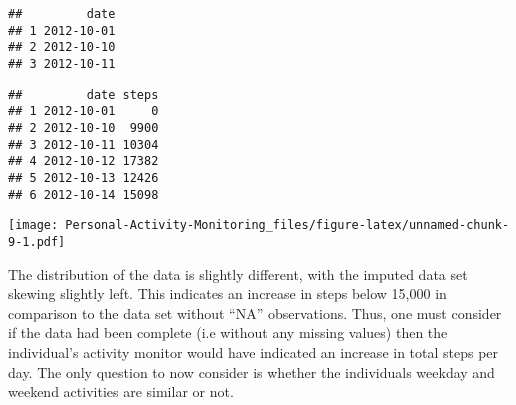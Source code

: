 \documentclass[]{article}
\newenvironment{Shaded}{\begin{snugshade}}{\end{snugshade}}
\newcommand{\KeywordTok}[1]{\textcolor[rgb]{0.13,0.29,0.53}{\textbf{#1}}}
\newcommand{\DataTypeTok}[1]{\textcolor[rgb]{0.13,0.29,0.53}{#1}}
\newcommand{\DecValTok}[1]{\textcolor[rgb]{0.00,0.00,0.81}{#1}}
\newcommand{\StringTok}[1]{\textcolor[rgb]{0.31,0.60,0.02}{#1}}
\newcommand{\OperatorTok}[1]{\textcolor[rgb]{0.81,0.36,0.00}{\textbf{#1}}}
\newcommand{\NormalTok}[1]{#1}
\begin{document}
\begin{verbatim}
##         date
## 1 2012-10-01
## 2 2012-10-10
## 3 2012-10-11
\end{verbatim}

\begin{Shaded}
\end{Shaded}

\begin{verbatim}
##         date steps
## 1 2012-10-01     0
## 2 2012-10-10  9900
## 3 2012-10-11 10304
## 4 2012-10-12 17382
## 5 2012-10-13 12426
## 6 2012-10-14 15098
\end{verbatim}

\begin{Shaded}
\end{Shaded}

\texttt{[image: Personal-Activity-Monitoring\_files/figure-latex/unnamed-chunk-9-1.pdf]}

The distribution of the data is slightly different, with the imputed
data set skewing slightly left. This indicates an increase in steps
below 15,000 in comparison to the data set without ``NA'' observations.
Thus, one must consider if the data had been complete (i.e without any
missing values) then the individual's activity monitor would have
indicated an increase in total steps per day. The only question to now
consider is whether the individuals weekday and weekend activities are
similar or not.
\end{document}
